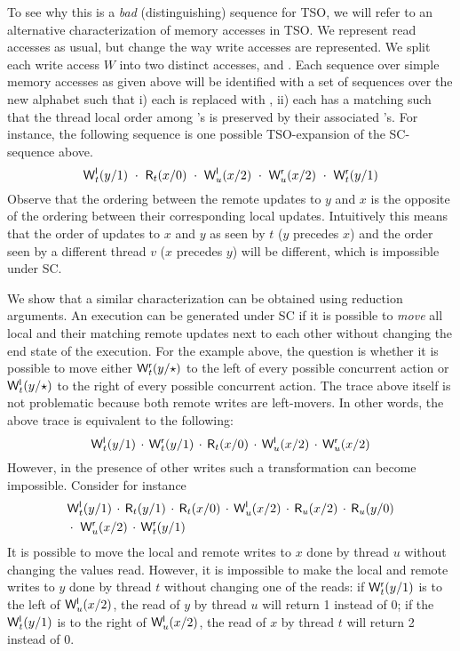 \documentclass[preprint,9pt]{sigplanconf}
\begin{document}
To see why this is a {\em bad} (distinguishing) sequence for TSO, we will refer to an alternative characterization of memory accesses in TSO.
We represent read accesses as usual, but change the way write accesses are represented.
We split each write access $W$ into two distinct accesses, {\locwrite} and {\remwrite}.
Each sequence over simple memory accesses as given above will be identified with a set of sequences over the new alphabet such that i) each {\aliwrite} is replaced with {\locwrite}, ii) each {\locwrite} has a matching {\remwrite} such that the thread local order among {\locwrite}'s is preserved by their associated {\remwrite}'s.
For instance, the following sequence is one possible TSO-expansion of the SC-sequence above.
\[
{\locwritex t y 1}\ \cdot\ {\alireadx t x 0}\ \cdot\ {\locwritex u x 2}\ \cdot\ {\remwritex u x 2}\ \cdot\ {\remwritex t y 1}
\]
Observe that the ordering between the remote updates to $y$ and $x$ is the opposite of the ordering between their corresponding local updates. 
Intuitively this means that the order of updates to $x$ and $y$ as seen by $t$ ($y$ precedes $x$) and the order seen by a different thread $v$ ($x$ precedes $y$) will be different, which is impossible under SC.

We show that a similar characterization can be obtained using reduction arguments.
An execution can be generated under SC if it is possible to {\em move} all local and their matching remote updates next to each other without changing the end state of the execution.
For the example above, the question is whether it is possible to move either $\mathsf{W}^{\mathsf{r}}_{t}(y/\star)$ to the left of every possible concurrent action or $\mathsf{W}^{\mathsf{l}}_{t}(y/\star)$ to the right of every possible concurrent action.
The trace above itself is not problematic because both remote writes are left-movers. 
In other words, the above trace is equivalent to the following:
\[
{\mathsf{W}^{\mathsf{l}}_{t}(y/1)}\,\cdot\,{\mathsf{W}^{\mathsf{r}}_{t}(y/1)}\,\cdot\,{\mathsf{R}_{t}(x/0)}\,\cdot\,{\mathsf{W}^{\mathsf{l}}_{u}(x/2)}\,\cdot\,{\mathsf{W}^{\mathsf{r}}_{u}(x/2)}
\]
However, in the presence of other writes such a transformation can become impossible.
Consider for instance
\begin{eqnarray*}
&{\mathsf{W}^{\mathsf{l}}_{t}(y/1)}\,\cdot\,{\mathsf{R}_{t}(y/1)}\,\cdot\,{\mathsf{R}_{t}(x/0)}\,\cdot\,{\mathsf{W}^{\mathsf{l}}_{u}(x/2)}\,\cdot\,{\mathsf{R}_{u}(x/2)}\,\cdot\,{\mathsf{R}_{u}(y/0)}\\
&\cdot\ {\mathsf{W}^{\mathsf{r}}_{u}(x/2)}\,\cdot\,{\mathsf{W}^{\mathsf{r}}_{t}(y/1)}
\end{eqnarray*}
It is possible to move the local and remote writes to $x$ done by thread $u$ without changing the values read.
However, it is impossible to make the local and remote writes to $y$ done by thread $t$ without changing one of the reads: if $\mathsf{W}^{\mathsf{r}}_{t}(y/1)$ is to the left of $\mathsf{W}^{\mathsf{l}}_{u}(x/2)$, the read of $y$ by thread $u$ will return 1 instead of 0; if the $\mathsf{W}^{\mathsf{l}}_{t}(y/1)$ is to the right of $\mathsf{W}^{\mathsf{l}}_{u}(x/2)$, the read of $x$ by thread $t$ will return 2 instead of 0.
\end{document}
